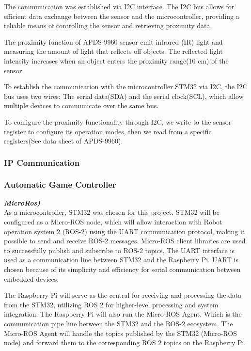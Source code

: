 The communication was established via I2C interface. The I2C bus allows for efficient data exchange between the sensor and the microcontroller, providing a reliable means of controlling the sensor and retrieving proximity data.

The proximity function of APDS-9960 sensor emit infrared (IR) light and measuring the amount of light that reflects off objects. The reflected light intensity increases when an object enters the proximity range(10 cm) of the sensor.

To establish the communication with the microcontroller STM32 via I2C, the I2C bus uses two wires: The serial data(SDA) and the serial clock(SCL), which allow multiple devices to communicate over the same bus.

To configure the proximity functionality through I2C, we write to the sensor register to configure its operation modes, then we read from a specific registers(See data sheet of APDS-9960).

\subsubsection{IP Communication}


\subsubsection{Automatic Game Controller}



\textbf{\textit{MicroRos)}}\\
As a microcontroller, STM32 was chosen for this project. STM32 will be configured as a Micro-ROS node, which will allow interaction with Robot operation system 2 (ROS-2) using the UART communication protocol, making it possible to send and receive ROS-2 messages.
Micro-ROS client libraries are used to successfully publish and subscribe to ROS-2 topics. The UART interface is used as a communication line between STM32 and the Raspberry Pi. UART is chosen because of its simplicity and efficiency for serial communication between embedded devices.

The Raspberry Pi will serve as the central for receiving and processing the data from the STM32, utilizing ROS 2 for higher-level processing and system integration. The Raspberry Pi will also run the Micro-ROS Agent. Which is the communication pipe line between the STM32 and the ROS-2 ecosystem. The Micro-ROS Agent will handle the topics published by the STM32 (Micro-ROS node) and forward them to the corresponding ROS 2 topics on the Raspberry Pi.

